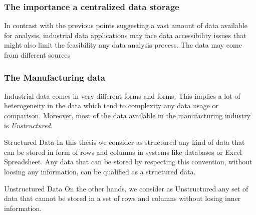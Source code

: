 
\subsubsection{The importance a centralized data storage}

In contrast with the previous points suggesting a vast amount of data available for analysis, industrial data applications may face data accessibility issues that might also limit the feasibility any data analysis process. The data may come from different sources

\subsubsection{The Manufacturing data}


Industrial data comes in very different forms and forms. This implies a lot of heterogeneity in the data which tend to complexity any data usage or comparison. Moreover, most of the data available in the manufacturing industry is \textit{Unstructured}. 

\begin{definition}[label=structured]{Structured Data}
In this thesis we consider as structured any kind of data that can be stored in form of rows and columns in systems like databases or Excel Spreadsheet. Any data that can be stored by respecting this convention, without loosing any information, can be qualified as a structured data.
\end{definition}

\begin{definition}[label=unstructured]{Unstructured Data}
 On the other hands, we consider as Unstructured any set of data that cannot be stored in a set of rows and columns without losing inner information. 
\end{definition}

